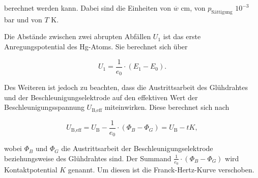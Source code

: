 berechnet werden kann. Dabei sind die Einheiten von $\overline{w}$ cm, von $p_\text{Sättigung}$ $10^{-3}$ bar und von $T$ K.


Die Abstände zwischen zwei abrupten Abfällen $U_1$ ist das erste Anregungspotential des Hg-Atoms. Sie berechnet sich über

\begin{equation}
    \label{eqn:anregungspotential}
    U_1 = \frac{1}{e_0} \cdot (E_1 - E_0).
\end{equation}

Des Weiteren ist jedoch zu beachten, dass die Austrittsarbeit des Glühdrahtes und der Beschleunigungselektrode auf den effektiven Wert der Beschleunigungsspannung $U_\text{B,eff}$ miteinwirken.
Diese berechnet sich nach

\begin{equation}
    \label{eqn:accl-eff}
    U_\text{B,eff} = U_\text{B} - \frac{1}{e_0} \cdot (\Phi_B - \Phi_G) = U_\text{B} -t K,
\end{equation}

wobei $\Phi_B$ und $\Phi_G$ die Austrittsarbeit der Beschleunigungselektrode beziehungsweise des Glühdrahtes sind.
Der Summand $\frac{1}{e_0} \cdot (\Phi_B - \Phi_G)$ wird Kontaktpotential $K$ genannt. Um diesen ist die Franck-Hertz-Kurve verschoben.
